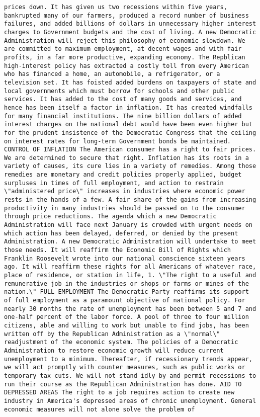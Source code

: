 \documentclass[
]{article}
\begin{document}
\begin{verbatim}
prices down. It has given us two recessions within five years, bankrupted many of our farmers, produced a record number of business failures, and added billions of dollars in unnecessary higher interest charges to Government budgets and the cost of living. A new Democratic Administration will reject this philosophy of economic slowdown. We are committed to maximum employment, at decent wages and with fair profits, in a far more productive, expanding economy. The Repblican high-interest policy has extracted a costly toll from every American who has financed a home, an automobile, a refrigerator, or a television set. It has foisted added burdens on taxpayers of state and local governments which must borrow for schools and other public services. It has added to the cost of many goods and services, and hence has been itself a factor in inflation. It has created windfalls for many financial institutions. The nine billion dollars of added interest charges on the national debt would have been even higher but for the prudent insistence of the Democratic Congress that the ceiling on interest rates for long-term Government bonds be maintained. CONTROL OF INFLATION The American consumer has a right to fair prices. We are determined to secure that right. Inflation has its roots in a variety of causes, its cure lies in a variety of remedies. Among those remedies are monetary and credit policies properly applied, budget surpluses in times of full employment, and action to restrain \"administered price\" increases in industries where economic power rests in the hands of a few. A fair share of the gains from increasing productivity in many industries should be passed on to the consumer through price reductions. The agenda which a new Democratic Administration will face next January is crowded with urgent needs on which action has been delayed, deferred, or denied by the present Administration. A new Democratic Administration will undertake to meet those needs. It will reaffirm the Economic Bill of Rights which Franklin Roosevelt wrote into our national conscience sixteen years ago. It will reaffirm these rights for all Americans of whatever race, place of residence, or station in life, 1. \"The right to a useful and remunerative job in the industries or shops or farms or mines of the nation.\" FULL EMPLOYMENT The Democratic Party reaffirms its support of full employment as a paramount objective of national policy. For nearly 30 months the rate of unemployment has been between 5 and 7 and one-half percent of the labor force. A pool of three to four million citizens, able and willing to work but unable to find jobs, has been written off by the Republican Administration as a \"normal\" readjustment of the economic system. The policies of a Democratic Administration to restore economic growth will reduce current unemployment to a minimum. Thereafter, if recessionary trends appear, we will act promptly with counter measures, such as public works or temporary tax cuts. We will not stand idly by and permit recessions to run their course as the Republican Administration has done. AID TO DEPRESSED AREAS The right to a job requires action to create new industry in America's depressed areas of chronic unemployment. General economic measures will not alone solve the problem of 
\end{verbatim}
\end{document}
